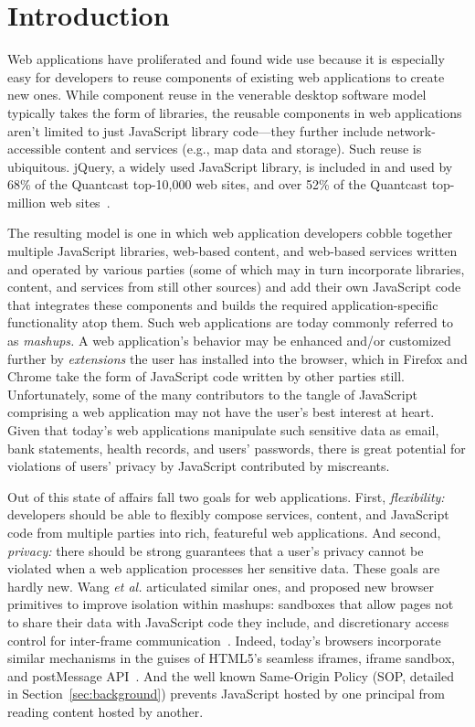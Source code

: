 \section{Introduction}
\label{sec:intro}

Web applications have proliferated and found wide use because it is
especially easy for developers to reuse components of existing web
applications to create new ones. While component reuse in the
venerable desktop software model typically takes the form of
libraries, the reusable components in web applications aren't limited
to just JavaScript library code---they further include
network-accessible content and services (e.g., map data and
storage). Such reuse is ubiquitous. jQuery, a widely used JavaScript
library, is included in and used by 68\% of the Quantcast top-10,000
web sites, and over 52\% of the Quantcast top-million web
sites~\cite{quantcast}.

The resulting model is one in which web application developers cobble
together multiple JavaScript libraries, web-based content, and
web-based services written and operated by various parties (some of
which may in turn incorporate libraries, content, and services from
still other sources) and add their own JavaScript code that integrates
these components and builds the required application-specific
functionality atop them. Such web applications are today commonly
referred to as {\em mashups.} A web application's behavior may be
enhanced and/or customized further by {\em extensions} the
user has installed into the browser, which in Firefox and Chrome take
the form of JavaScript code written by other parties
still. Unfortunately, some of the many contributors to the tangle of
JavaScript comprising a web application may not have the user's best
interest at heart. Given that today's web applications manipulate such
sensitive data as email, bank statements, health records, and users'
passwords, there is great potential for violations of users' privacy
by JavaScript contributed by miscreants.

Out of this state of affairs fall two goals for web
applications. First, {\em flexibility:} developers should be able to
flexibly compose services, content, and JavaScript code from multiple
parties into rich, featureful web applications. And second, {\em
  privacy:} there should be strong guarantees that a user's privacy
cannot be violated when a web application processes her sensitive
data. These goals are hardly new. Wang {\em et al.} articulated
similar ones, and proposed new browser primitives to improve isolation
within mashups: sandboxes that allow pages not to share their data
with JavaScript code they include, and discretionary access control
for inter-frame communication~\cite{mashupos}. Indeed, today's
browsers incorporate similar mechanisms in the guises of HTML5's
seamless iframes, iframe sandbox, and postMessage API~\cite{html5}.
And the well known Same-Origin Policy (SOP, detailed in
Section~\ref{sec:background}) prevents JavaScript hosted by one principal from
reading content hosted by another.

